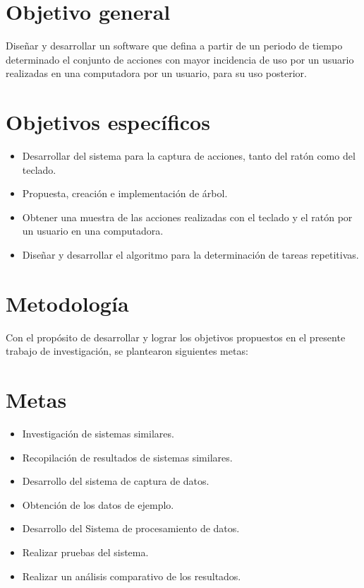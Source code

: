 \section{Objetivo general} 
Dise\~nar y desarrollar un software que defina a partir de un periodo de tiempo
 determinado el conjunto de acciones con mayor incidencia de uso por un usuario
 realizadas en una computadora por un usuario, para su uso posterior.

\section{Objetivos espec\'ificos}
\begin{itemize}
  \item Desarrollar del sistema para la captura de acciones, tanto del  rat\'on
  como del teclado.
  \item Propuesta, creaci\'on e implementaci\'on de \'arbol.
  \item Obtener una muestra de las acciones realizadas con el teclado y el 
  rat\'on por un usuario en una computadora.
  \item Dise\~nar y desarrollar el algoritmo para la determinaci\'on de tareas
  repetitivas.
\end{itemize}


\section{Metodolog\'ia}
Con el prop\'osito de desarrollar y lograr los objetivos propuestos en el presente trabajo de investigaci\'on, se plantearon siguientes metas:
\section*{Metas}
\begin{itemize}
  \item Investigaci\'on de sistemas similares.
  \item Recopilaci\'on de resultados de sistemas similares.
  \item Desarrollo del sistema  de captura de datos.
  \item Obtenci\'on de los datos de ejemplo.
  \item Desarrollo del Sistema de procesamiento de datos.
  \item Realizar pruebas del sistema.
  \item Realizar un an\'alisis comparativo de los resultados.
\end{itemize}